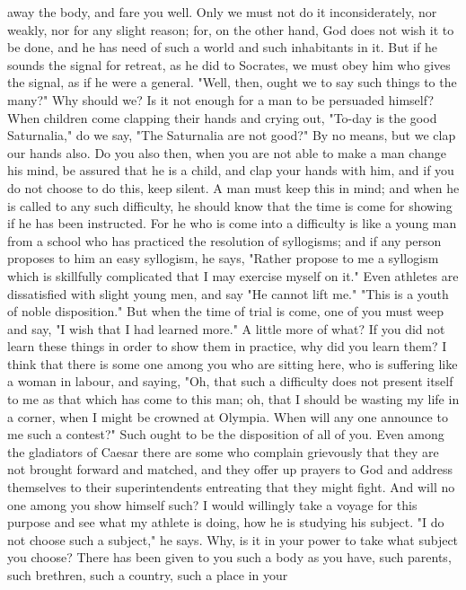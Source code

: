\documentclass[a4paper]{article}
\begin{document}
away the body, and fare you well. Only we must not do it inconsiderately, nor
weakly, nor for any slight reason; for, on the other hand, God does not wish it
to be done, and he has need of such a world and such inhabitants in it. But if
he sounds the signal for retreat, as he did to Socrates, we must obey him who
gives the signal, as if he were a general.
    "Well, then, ought we to say such things to the many?" Why should we? Is it
not enough for a man to be persuaded himself? When children come clapping their
hands and crying out, "To-day is the good Saturnalia," do we say, "The
Saturnalia are not good?" By no means, but we clap our hands also. Do you also
then, when you are not able to make a man change his mind, be assured that he
is a child, and clap your hands with him, and if you do not choose to do this,
keep silent.
    A man must keep this in mind; and when he is called to any such difficulty,
he should know that the time is come for showing if he has been instructed. For
he who is come into a difficulty is like a young man from a school who has
practiced the resolution of syllogisms; and if any person proposes to him an
easy syllogism, he says, "Rather propose to me a syllogism which is skillfully
complicated that I may exercise myself on it." Even athletes are dissatisfied
with slight young men, and say "He cannot lift me." "This is a youth of noble
disposition." But when the time of trial is come, one of you must weep and say,
"I wish that I had learned more." A little more of what? If you did not learn
these things in order to show them in practice, why did you learn them? I think
that there is some one among you who are sitting here, who is suffering like a
woman in labour, and saying, "Oh, that such a difficulty does not present
itself to me as that which has come to this man; oh, that I should be wasting
my life in a corner, when I might be crowned at Olympia. When will any one
announce to me such a contest?" Such ought to be the disposition of all of you.
Even among the gladiators of Caesar there are some who complain grievously that
they are not brought forward and matched, and they offer up prayers to God and
address themselves to their superintendents entreating that they might fight.
And will no one among you show himself such? I would willingly take a voyage
for this purpose and see what my athlete is doing, how he is studying his
subject. "I do not choose such a subject," he says. Why, is it in your power to
take what subject you choose? There has been given to you such a body as you
have, such parents, such brethren, such a country, such a place in your
\end{document}

